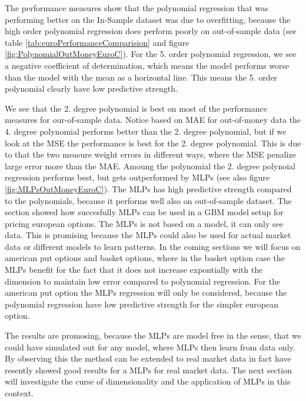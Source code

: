 The performance measures show that the polynomial regression that was performing better on the In-Sample dataset was due to overfitting, because the high order polynomial regression does perform poorly on out-of-sample data (see table \ref{tab:euroPerformanceComparision} and figure \ref{fig:PolynomialOutMoneyEuroC}). For the 5. order polynomial regression, we see a negative coefficient of determination, which means the model performs worse than the model with the mean as a horizontal line. This means the 5. order polynomial clearly have low predictive strength. 



We see that the 2. degree polynomial is best on most of the performance measures for our-of-sample data. Notice based on MAE for out-of-money data the 4. degree polynomial performs better than the 2. degree polynomial, but if we look at the MSE the performance is best for the 2. degree polynomial. This is due to that the two measure weight errors in different ways, where the MSE penalize large error more than the MAE. Amoung the polynomial the 2. degree polynoial regression performs best, but gets outperformed by MLPs (see also figure \ref{fig:MLPsOutMoneyEuroC}). The MLPs has high predictive strength compared to the polynomials, because it performs well also on out-of-sample dataset. The section showed how succesfully MLPs can be used in a GBM model setup for pricing european options. The MLPs is not based on a model, it can only see data. This is promising because the MLPs could also be used for actual market data or different models to learn patterns. In the coming sections we will focus on american put options and basket options, where in the basket option case the MLPs benefit for the fact that it does not increase expontially with the dimension to maintain low error compared to polynomial regression. For the american put option the MLPs regression will only be considered, because the polynomial regression have low predictive strength for the simpler european option.





The results are promosing, because the MLPs are model free in the sense, that we could have simulated out for any model, where MLPs then learn from data only. By observing this the method can be extended to real market data in fact \parencite{GasparRaquel20} have resently showed good results for a MLPs for real market data. The next section will investigate the curse of dimensionality and the application of MLPs in this context.
\parencite{FergusonRyan2018}









